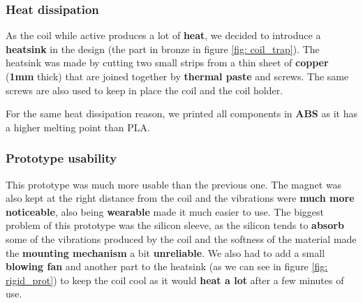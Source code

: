\begin{itemize}
\end{itemize}

\subsubsection{Heat dissipation}
As the coil while active produces a lot of \textbf{heat}, we decided to introduce a \textbf{heatsink} in the design (the part in bronze in figure \ref{fig: coil_trap}).
The heatsink was made by cutting two small strips from a thin sheet of \textbf{copper} (\textbf{1mm} thick) that are joined together by \textbf{thermal paste} and screws.
The same screws are also used to keep in place the coil and the coil holder.

For the same heat dissipation reason, we printed all components in \textbf{ABS} as it has a higher melting point than PLA.

\subsubsection{Prototype usability}
This prototype was much more usable than the previous one.
The magnet was also kept at the right distance from the coil and the vibrations were \textbf{much more noticeable}, also being \textbf{wearable} made it much easier to use.
The biggest problem of this prototype was the silicon sleeve, as the silicon tends to \textbf{absorb} some of the vibrations produced by the coil and the softness of the material made the \textbf{mounting mechanism} a bit \textbf{unreliable}.
We also had to add a small \textbf{blowing fan} and another part to the heatsink (as we can see in figure \ref{fig: rigid_prot}) to keep the coil cool as it would \textbf{heat a lot} after a few minutes of use.

